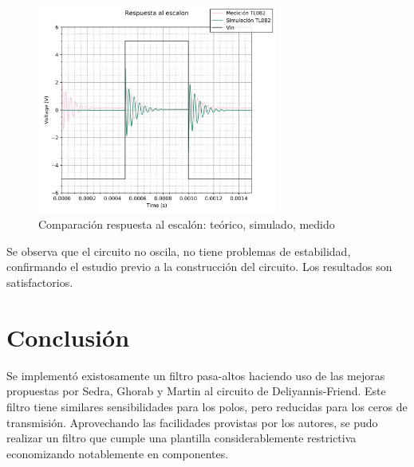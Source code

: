 \documentclass[spanish]{article}
\begin{document}
\begin{figure}[H]
    \centering
    \includegraphics[width=0.7\textwidth]{Resources/medicrespesc.png}
    \caption{Comparación respuesta al escalón: teórico, simulado, medido}
    \label{medicrespesc}
\end{figure}

Se observa que el circuito no oscila, no tiene problemas de estabilidad, confirmando el estudio previo a la construcción del circuito. Los resultados son satisfactorios.

\section{Conclusión}
Se implementó existosamente un filtro pasa-altos haciendo uso de las mejoras propuestas por Sedra, Ghorab y Martin al circuito de Deliyannis-Friend. Este filtro tiene similares sensibilidades para los polos, pero reducidas para los ceros de transmisión. Aprovechando las facilidades provistas por los autores, se pudo realizar un filtro que cumple una plantilla considerablemente restrictiva economizando notablemente en componentes.%
\end{document}
